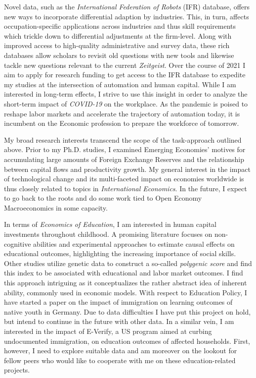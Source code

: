 \documentclass[a4paper,11pt]{article}
\begin{document}
Novel data, such as the \textit{International Federation of Robots} (IFR) database, offers new ways to incorporate differential adaption by industries. This, in turn, affects occupation-specific applications across industries and thus skill requirements which trickle down to differential adjustments at the firm-level. Along with improved access to high-quality administrative and survey data, these rich databases allow  scholars to revisit old questions with new tools and likewise tackle new questions relevant to the current \textit{Zeitgeist}. Over the course of 2021 I aim to apply for research funding to get access to the IFR database to expedite my studies at the intersection of automation and human capital. While I am interested in long-term effects, I strive to use this insight in order to analyze the short-term impact of \textit{COVID-19} on the workplace. As the pandemic is poised to reshape labor markets and accelerate the trajectory of automation today, it is incumbent on the Economic profession to prepare the workforce of tomorrow. 

My broad research interests transcend the scope of the task-approach outlined above. Prior to my Ph.D. studies, I examined Emerging Economies' motives for accumulating large amounts of Foreign Exchange Reserves and the relationship between capital flows and productivity growth. My general interest in the impact of technological change and its multi-faceted impact on economies worldwide is thus closely related to topics in \textit{International Economics}. In the future, I expect to go back to the roots and do some work tied to Open Economy Macroeconomics in some capacity. 

In terms of \textit{Economics of Education}, I am interested in human capital investments throughout childhood. A promising literature focuses on non-cognitive abilities and experimental approaches to estimate causal effects on educational outcomes, highlighting the increasing importance of social skills. Other studies utilize genetic data to construct a so-called \textit{polygenic score} and find this index to be associated with educational and labor market outcomes. I find this approach intriguing as it conceptualizes the rather abstract idea of inherent ability, commonly used in economic models. With respect to Education Policy, I have started a paper on the impact of immigration on learning outcomes of native youth in Germany. Due to data difficulties I have put this project on hold, but intend to continue in the future with other data. In a similar vein, I am interested in the impact of E-Verify, a US program aimed at curbing undocumented immigration, on education outcomes of affected households. First, however, I need to explore suitable data and am moreover on the lookout for fellow peers who would like to cooperate with me on these education-related projects. 
\end{document}
